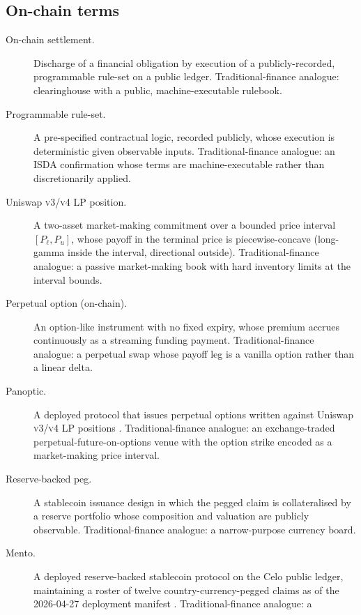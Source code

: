 \subsection*{On-chain terms}
\begin{description}
  \item[On-chain settlement.] Discharge of a financial obligation by execution
        of a publicly-recorded, programmable rule-set on a public ledger.
        Traditional-finance analogue: clearinghouse with a public,
        machine-executable rulebook.
  \item[Programmable rule-set.] A pre-specified contractual logic, recorded
        publicly, whose execution is deterministic given observable inputs.
        Traditional-finance analogue: an ISDA confirmation whose terms are
        machine-executable rather than discretionarily applied.
  \item[Uniswap \textsc{v3}/\textsc{v4} LP position.] A two-asset
        market-making commitment over a bounded price interval
        \([P_{\ell}, P_{u}]\), whose payoff in the terminal price is
        piecewise-concave (long-gamma inside the interval, directional
        outside). Traditional-finance analogue: a passive market-making book
        with hard inventory limits at the interval bounds.
  \item[Perpetual option (on-chain).] An option-like instrument with no fixed
        expiry, whose premium accrues continuously as a streaming funding
        payment. Traditional-finance analogue: a perpetual swap whose payoff
        leg is a vanilla option rather than a linear delta.
  \item[Panoptic.] A deployed protocol that issues perpetual options written
        against Uniswap \textsc{v3}/\textsc{v4} LP positions
        \citep{panoptic_docs_2026}. Traditional-finance analogue: an
        exchange-traded perpetual-future-on-options venue with the option
        strike encoded as a market-making price interval.
  \item[Reserve-backed peg.] A stablecoin issuance design in which the pegged
        claim is collateralised by a reserve portfolio whose composition and
        valuation are publicly observable. Traditional-finance analogue: a
        narrow-purpose currency board.
  \item[Mento.] A deployed reserve-backed stablecoin protocol on the Celo
        public ledger, maintaining a roster of twelve country-currency-pegged
        claims as of the 2026-04-27 deployment manifest
        \citep{mento_v3_deployments_2026}. Traditional-finance analogue: a

\end{description}

